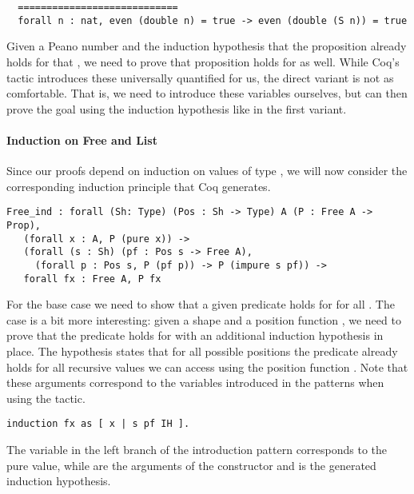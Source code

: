 \begin{verbatim}
  ============================
  forall n : nat, even (double n) = true -> even (double (S n)) = true
\end{verbatim}

Given a Peano number  and the induction hypothesis that the
proposition already holds for that , we need to prove that
proposition holds for  as well.
While Coq's  tactic introduces these universally
quantified for us, the direct variant is not as comfortable.
That is, we need to introduce these variables ourselves, but can then
prove the goal using the induction hypothesis like in the first
variant.

\paragraph{Induction on Free and List}

Since our proofs depend on induction on values of type , we
will now consider the corresponding induction principle that Coq
generates.

\begin{verbatim}
Free_ind : forall (Sh: Type) (Pos : Sh -> Type) A (P : Free A -> Prop),
   (forall x : A, P (pure x)) ->
   (forall (s : Sh) (pf : Pos s -> Free A),
     (forall p : Pos s, P (pf p)) -> P (impure s pf)) ->
   forall fx : Free A, P fx
\end{verbatim}

For the base case we need to show that a given predicate 
holds for  for all .
The  case is a bit more interesting: given a shape
 and a position function , we need to prove that the
predicate holds for  with an additional induction
hypothesis in place.
The hypothesis states that for all possible positions  the
predicate already holds for all recursive values we can access using
the position function .
Note that these arguments correspond to the variables introduced in
the patterns when using the  tactic.

\begin{verbatim}
induction fx as [ x | s pf IH ].
\end{verbatim}

The variable  in the left branch of the introduction pattern
corresponds to the pure value, while   are the
arguments of the  constructor and  is the
generated induction hypothesis.

